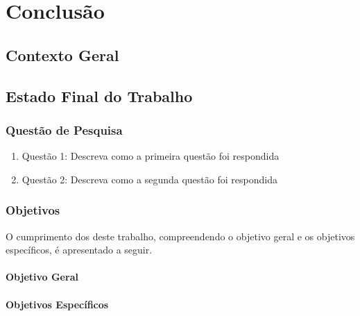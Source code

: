 \chapter{Conclusão}
\label{cap-status-atual}


\section{Contexto Geral}
\label{contexto-geral}

\section{Estado Final do Trabalho}
\label{status-final}

\subsection{Questão de Pesquisa}
\label{status-pesquisa}

\begin{enumerate}
\item Questão 1: Descreva como a primeira questão foi respondida
\item Questão 2: Descreva como a segunda questão foi respondida
\end{enumerate}

\subsection{Objetivos}
\label{status-objetivos}

O cumprimento dos  deste trabalho, compreendendo o objetivo geral e os objetivos específicos, é apresentado a seguir.

\subsubsection{Objetivo Geral}
\label{status-objetivo-geral}

\subsubsection{Objetivos Específicos}
\label{status-objetivo-especificos}

